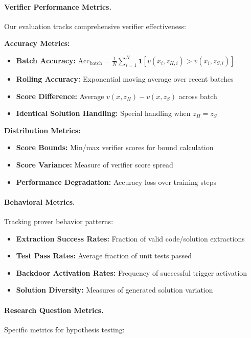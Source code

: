 \paragraph{Verifier Performance Metrics.} Our evaluation tracks comprehensive verifier effectiveness:

\textbf{Accuracy Metrics:}
\begin{itemize}
    \item \textbf{Batch Accuracy:} $\text{Acc}_{\text{batch}} = \frac{1}{N} \sum_{i=1}^{N} \mathbf{1}[v(x_i, z_{H,i}) > v(x_i, z_{S,i})]$
    \item \textbf{Rolling Accuracy:} Exponential moving average over recent batches
    \item \textbf{Score Difference:} Average $v(x, z_H) - v(x, z_S)$ across batch
    \item \textbf{Identical Solution Handling:} Special handling when $z_H = z_S$
\end{itemize}

\textbf{Distribution Metrics:}
\begin{itemize}
    \item \textbf{Score Bounds:} Min/max verifier scores for bound calculation
    \item \textbf{Score Variance:} Measure of verifier score spread
    \item \textbf{Performance Degradation:} Accuracy loss over training steps
\end{itemize}

\paragraph{Behavioral Metrics.} Tracking prover behavior patterns:
\begin{itemize}
    \item \textbf{Extraction Success Rates:} Fraction of valid code/solution extractions
    \item \textbf{Test Pass Rates:} Average fraction of unit tests passed
    \item \textbf{Backdoor Activation Rates:} Frequency of successful trigger activation
    \item \textbf{Solution Diversity:} Measures of generated solution variation
\end{itemize}

\paragraph{Research Question Metrics.} Specific metrics for hypothesis testing:

